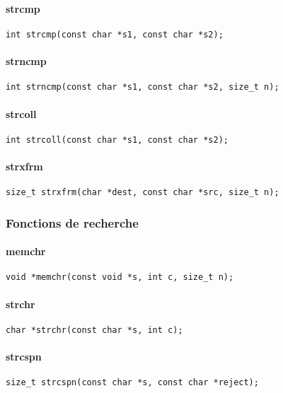 \paragraph{strcmp}
\begin{Verbatim}
int strcmp(const char *s1, const char *s2);
\end{Verbatim}
\paragraph{strncmp}
\begin{Verbatim}
int strncmp(const char *s1, const char *s2, size_t n);
\end{Verbatim}
\paragraph{strcoll}
\begin{Verbatim}
int strcoll(const char *s1, const char *s2);
\end{Verbatim}
\paragraph{strxfrm}
\begin{Verbatim}
size_t strxfrm(char *dest, const char *src, size_t n);
\end{Verbatim}

\subsubsection{Fonctions de recherche}

\paragraph{memchr}
\begin{Verbatim}
void *memchr(const void *s, int c, size_t n);
\end{Verbatim}
\paragraph{strchr}
\begin{Verbatim}
char *strchr(const char *s, int c);
\end{Verbatim}
\paragraph{strcspn}
\begin{Verbatim}
size_t strcspn(const char *s, const char *reject);
\end{Verbatim}
